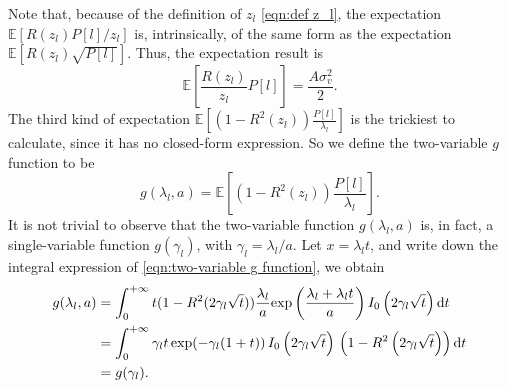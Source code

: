 \documentclass[12pt,draftclsnofoot,journal,onecolumn]{IEEEtran}
\theoremstyle{nonumberplain}
\def \exp {\text{exp}}
\begin{document}
    Note that, because of the definition of $z_l$ \eqref{eqn:def z_l}, the expectation $\mathbb{E}\left[R(z_l)P[l]/z_l\right]$ is, intrinsically, of the same form as the expectation $\mathbb{E}\left[R(z_l) \sqrt{P[l]}\right]$. Thus, the expectation result is
    \begin{equation}
        \mathbb{E}\left[\frac{R(z_l)}{z_l} P[l]\right] = \frac{A\sigma_v^2}{2}.
        \label{eqn:expectation_second_kind_2}
    \end{equation}
    The third kind of expectation $\mathbb{E}\left[(1-R^2(z_l))\frac{P[l]}{\lambda_l}\right]$ is the trickiest to calculate, since it has no closed-form expression. So we define the two-variable $g$ function to be 
    \begin{equation}
        g(\lambda_l, a) = \mathbb{E}\left[(1-R^2(z_l))\frac{P[l]}{\lambda_l}\right].
        \label{eqn:two-variable g function}
    \end{equation}
    It is not trivial to observe that the two-variable function $g(\lambda_l, a)$ is, in fact, a single-variable function $g(\gamma_l)$, with $\gamma_l=\lambda_l/a$. Let $x=\lambda_l t$, and write down the integral expression of \eqref{eqn:two-variable g function}, we obtain 
    \begin{equation}
        \begin{aligned}
        g(\lambda_l, a) & = \int_{0}^{+\infty} t(1-R^2(2\gamma_l\sqrt{t})) \frac{\lambda_l}{a} \exp\left(\frac{\lambda_l + \lambda_l t}{a}\right) I_0\left(2\gamma_l\sqrt{t}\right){\rm d}t \\
        & = \int_{0}^{+\infty}\gamma_l t \, \exp(-\gamma_l(1+t))\, I_0\left(2\gamma_l\sqrt{t}\right)\,\left(1-R^2\left(2\gamma_l\sqrt{t}\right)\right){\rm d}t \\
        & = g(\gamma_l).
        \end{aligned}
        \label{eqn:proof precise g function}
    \end{equation}
    
\end{document}
